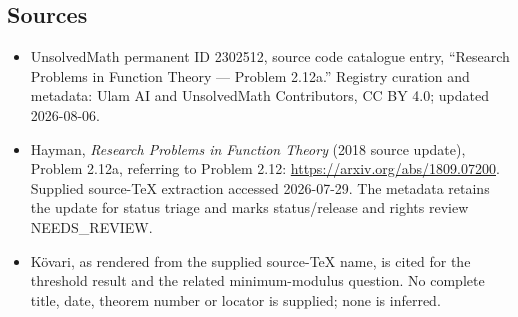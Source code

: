 \documentclass[11pt]{article}
\begin{document}
\subsection{Sources}
\begin{itemize}
\item UnsolvedMath permanent ID 2302512, source code catalogue entry, ``Research Problems in Function Theory --- Problem 2.12a.'' Registry curation and metadata: Ulam AI and UnsolvedMath Contributors, CC BY 4.0; updated 2026-08-06.
\item Hayman, \emph{Research Problems in Function Theory} (2018 source update), Problem 2.12a, referring to Problem 2.12: \url{https://arxiv.org/abs/1809.07200}. Supplied source-TeX extraction accessed 2026-07-29. The metadata retains the update for status triage and marks status/release and rights review NEEDS\_REVIEW.
\item Kövari, as rendered from the supplied source-TeX name, is cited for the threshold result and the related minimum-modulus question. No complete title, date, theorem number or locator is supplied; none is inferred.
\end{itemize}
\end{document}
